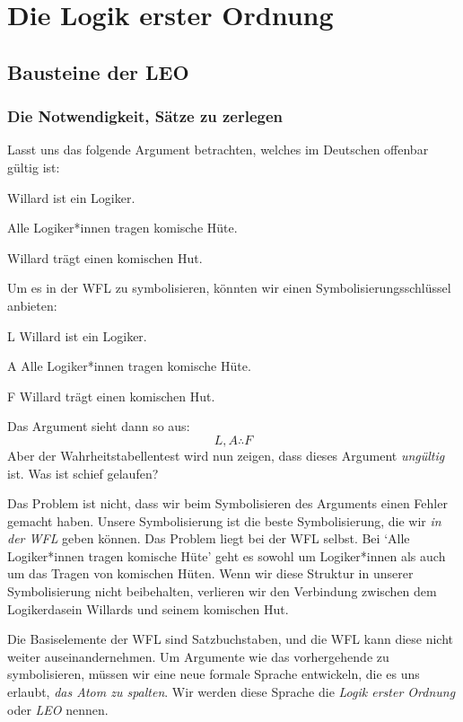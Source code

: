 
\part{Die Logik erster Ordnung}
\label{ch.FOL}
\chapter{Bausteine der LEO}\label{s:FOLBuildingBlocks}

\section{Die Notwendigkeit, Sätze zu zerlegen}
Lasst uns das folgende Argument betrachten, welches im Deutschen offenbar gültig ist:
\begin{earg}
\label{willard1}
\item[] Willard ist ein Logiker.
\item[] Alle Logiker*innen tragen komische Hüte. 
\item[\therefore] Willard trägt einen komischen Hut.
\end{earg}
Um es in der WFL zu symbolisieren, könnten wir einen Symbolisierungsschlüssel anbieten:
\begin{ekey}
\item[L] Willard ist ein Logiker.
\item[A] Alle Logiker*innen tragen komische Hüte.
\item[F] Willard trägt einen komischen Hut.
\end{ekey}
Das Argument sieht dann so aus:
$$L, A \therefore F$$
Aber der Wahrheitstabellentest wird nun zeigen, dass dieses Argument \emph{ungültig} ist. Was ist schief gelaufen?

Das Problem ist nicht, dass wir beim Symbolisieren des Arguments einen Fehler gemacht haben. Unsere Symbolisierung ist die beste Symbolisierung, die wir \emph{in der WFL} geben können. Das Problem liegt bei der WFL selbst. Bei `Alle Logiker*innen tragen komische Hüte' geht es sowohl um Logiker*innen als auch um das Tragen von komischen Hüten. Wenn wir diese Struktur in unserer Symbolisierung nicht beibehalten, verlieren wir den Verbindung zwischen dem Logikerdasein Willards und seinem komischen Hut.

Die Basiselemente der WFL sind Satzbuchstaben, und die WFL kann diese nicht weiter auseinandernehmen. Um Argumente wie das vorhergehende zu symbolisieren, müssen wir eine neue formale Sprache entwickeln, die es uns erlaubt, \emph{das Atom zu spalten}. Wir werden diese Sprache die \emph{Logik erster Ordnung} oder \emph{LEO} nennen. 

